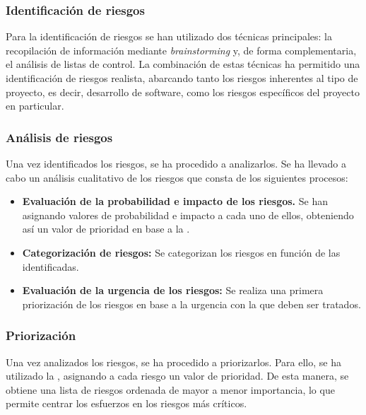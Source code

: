 \subsubsection*{Identificación de riesgos}
Para la identificación de riesgos se han utilizado dos técnicas principales: la recopilación de información mediante \textit{brainstorming} y, de forma complementaria, el análisis de listas de control. La combinación de estas técnicas ha permitido una identificación de riesgos realista, abarcando tanto los riesgos inherentes al tipo de proyecto, es decir, desarrollo de software, como los riesgos específicos del proyecto en particular.

\subsubsection*{Análisis de riesgos}
Una vez identificados los riesgos, se ha procedido a analizarlos. Se ha llevado a cabo un análisis cualitativo de los riesgos que consta de los siguientes procesos:
\begin{itemize}
    \item \textbf{Evaluación de la probabilidad e impacto de los riesgos.} Se han asignando valores de probabilidad e impacto a cada uno de ellos, obteniendo así un valor de prioridad en base a la .
    \item \textbf{Categorización de riesgos:} Se categorizan los riesgos en función de las  identificadas.
    \item \textbf{Evaluación de la urgencia de los riesgos:} Se realiza una primera priorización de los riesgos en base a la urgencia con la que deben ser tratados.
\end{itemize}


\subsubsection*{Priorización}
Una vez analizados los riesgos, se ha procedido a priorizarlos. Para ello, se ha utilizado la , asignando a cada riesgo un valor de prioridad. 
De esta manera, se obtiene una lista de riesgos ordenada de mayor a menor importancia, lo que permite centrar los esfuerzos en los riesgos más críticos.

